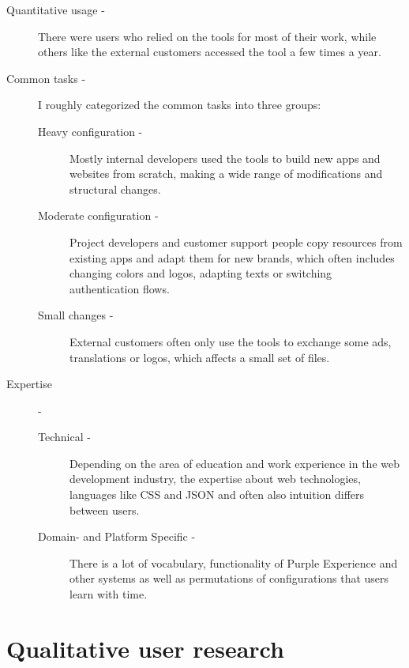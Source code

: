 \begin{description}
  \item[Quantitative usage -] There were users who relied on the tools for most of their work, while others like the external customers accessed the tool a few times a year.
  \item[Common tasks -] I roughly categorized the common tasks into three groups:
  \begin{description}
    \item[Heavy configuration -] Mostly internal developers used the tools to build new apps and websites from scratch, making a wide range of modifications and structural changes.
    \item[Moderate configuration -] Project developers and customer support people copy resources from existing apps and adapt them for new brands, which often includes changing colors and logos, adapting texts or switching authentication flows.
    \item[Small changes -] External customers often only use the tools to exchange some ads, translations or logos, which affects a small set of files.
  \end{description}
  \item[Expertise] -
  \begin{description}
    \item[Technical -] Depending on the area of education and work experience in the web development industry, the expertise about web technologies, languages like CSS and JSON and often also intuition differs between users.
    \item[Domain- and Platform Specific -] There is a lot of vocabulary, functionality of Purple Experience and other systems as well as permutations of configurations that users learn with time.
  \end{description}
\end{description}

\section{Qualitative user research}


